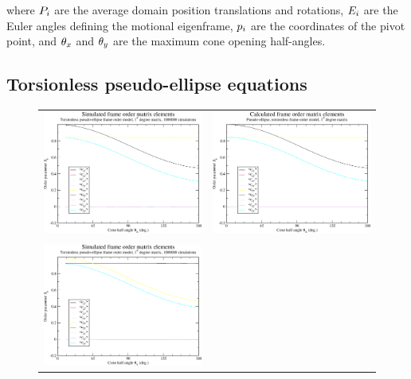 where $P_i$ are the average domain position translations and rotations, $E_i$ are the Euler angles defining the motional eigenframe, $p_i$ are the coordinates of the pivot point, and $\theta_x$ and $\theta_y$ are the maximum cone opening half-angles.


\subsection{Torsionless pseudo-ellipse equations}

\begin{figure}
\centering
  \begin{tabular}{@{}cc@{}}
    \includegraphics[width=.5\textwidth]{images/frame_order_matrix/Sij_pseudo-ellipse_torsionless_in_frame_theta_x_ens1000000.eps} &
    \includegraphics[width=.5\textwidth]{images/frame_order_matrix/Sij_pseudo-ellipse_torsionless_in_frame_theta_x_calc.eps} \\
    \\[-5pt]
    \includegraphics[width=.5\textwidth]{images/frame_order_matrix/Sij_pseudo-ellipse_torsionless_in_frame_theta_y_ens1000000.eps} &

\end{tabular}
\end{figure}
